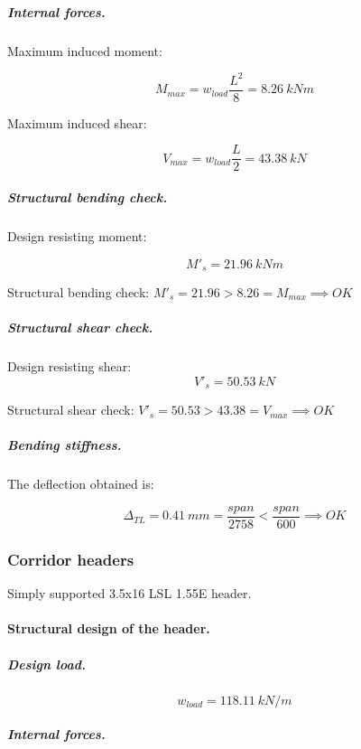 \subparagraph{Internal forces.}

\noindent Maximum induced moment:

\begin{equation}
  M_{max}= w_{load} \frac{L^2}{8}= 8.26\ kN m
\end{equation}

\noindent Maximum induced shear:

\begin{equation}
  V_{max}= w_{load} \frac{L}{2}= 43.38\ kN
\end{equation}

\subparagraph{Structural bending check.}

\noindent Design resisting moment:

\begin{equation}
  M'_s= 21.96\ kN m
\end{equation}

\noindent Structural bending check: $M'_s = 21.96 > 8.26 = M_{max} \implies OK$

\subparagraph{Structural shear check.}

\noindent Design resisting shear:
\begin{equation}
  V'_s= 50.53\ kN
\end{equation}

\noindent Structural shear check: $V'_s = 50.53 > 43.38 = V_{max} \implies OK$

\subparagraph{Bending stiffness.}
The deflection obtained is:

\begin{equation}
  \Delta_{TL}= 0.41\ mm= \frac{span}{2758} < \frac{span}{600} \implies OK
\end{equation}

\subsubsection{Corridor headers}
Simply supported 3.5x16 LSL 1.55E header.

\paragraph{Structural design of the header.}

\subparagraph{Design load.}

\begin{equation}
  w_{load}= 118.11\ kN/m
\end{equation}

\subparagraph{Internal forces.}

